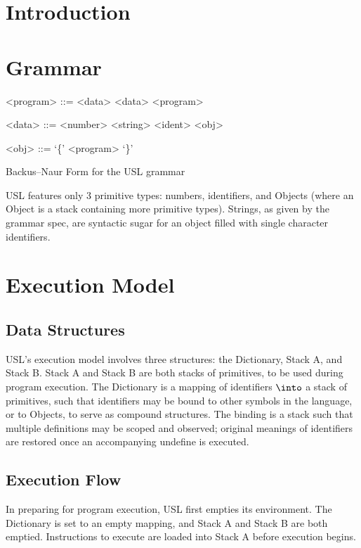 
\usepackage{minted}

	\MYHEADERS{}
	\tableofcontents
	\vfill
	\pagebreak
	\section{Introduction}
	\section{Grammar}
	\begin{listing}
		\centering
		\begin{grammar}
			<program> ::= <data>
				\alt <data> <program>

			<data> ::= <number>  \alt <ident> \alt <obj>

			<obj> ::= `\{'  <program> `\}'
		\end{grammar}
		\caption{Backus--Naur Form for the USL grammar}
	\end{listing}
	USL features only 3 primitive types: numbers, identifiers, and Objects (where an Object is a stack containing more primitive types). Strings, as given by the grammar spec, are syntactic sugar for an object filled with single character identifiers.
	\section{Execution Model}
	\subsection{Data Structures}
	USL’s execution model involves three structures: the Dictionary, Stack A, and Stack B. Stack A and Stack B are both stacks of primitives, to be used during program execution. The Dictionary is a mapping of identifiers $\into$ a stack of primitives, such that identifiers may be bound to other symbols in the language, or to Objects, to serve as compound structures. The binding is a stack such that multiple definitions may be scoped and observed; original meanings of identifiers are restored once an accompanying undefine is executed.

	\subsection{Execution Flow}
		In preparing for program execution, USL first empties its environment. The Dictionary is set to an empty mapping, and Stack A and Stack B are both emptied. Instructions to execute are loaded into Stack A before execution begins.

